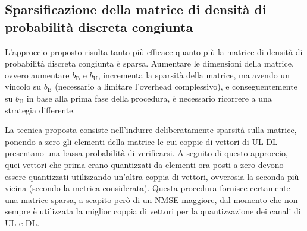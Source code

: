 \subsection{Sparsificazione della matrice di densità di probabilità discreta
congiunta}

L'approccio proposto risulta tanto più efficace quanto più la matrice di
densità di probabilità discreta congiunta è sparsa. Aumentare le dimensioni
della matrice, ovvero aumentare \(b_\mathrm{B}\) e \(b_\mathrm{U}\), incrementa
la sparsità della matrice, ma avendo un vincolo su \(b_\mathrm{B}\) (necessario
a limitare l'overhead complessivo), e conseguentemente su \(b_\mathrm{U}\) in
base alla prima fase della procedura, è necessario ricorrere a una strategia
differente.

La tecnica proposta consiste nell'indurre deliberatamente sparsità sulla
matrice, ponendo a zero gli elementi della matrice le cui coppie di vettori di
UL-DL presentano una bassa probabilità di verificarsi. A seguito di questo
approccio, quei vettori che prima erano quantizzati da elementi ora posti a
zero devono essere quantizzati utilizzando un'altra coppia di vettori,
ovverosia la seconda più vicina (secondo la metrica considerata). Questa
procedura fornisce certamente una matrice sparsa, a scapito però di un NMSE
maggiore, dal momento che non sempre è utilizzata la miglior coppia di vettori
per la quantizzazione dei canali di UL e DL.
